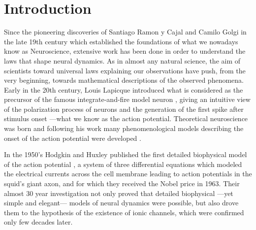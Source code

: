 \chapter*{\bf {Introduction}}
\label{cha:intro}




Since the pioneering discoveries of Santiago Ramon y Cajal and Camilo Golgi in
the late 19th century which established the foundations of what we nowadays know as
Neuroscience, extensive work has been done in order to understand the
laws that shape neural dynamics. As in almost any natural science,
the aim of scientists toward universal laws explaining our
observations have push, from the very beginning, towards mathematical
descriptions of the observed phenomena. Early in the 20th century,
Louis Lapicque introduced what is considered as the precursor  of
the famous integrate-and-fire model neuron \citep{Brunel2007}
\citep[see also][]{Brunel2007a,Abbott1999}, giving an intuitive view of the polarization
process of neurons and the generation of the  
first spike after stimulus onset ---what we know as
the action potential. Theoretical
neuroscience was born and following his work many phenomenological
models describing the onset of the action potential were developed
\citep{Hill1936,McCulloch1943,Stein1965,Geisler1966,Weiss1966,Stein1967b}.

In the 1950's Hodgkin and Huxley published the first detailed biophysical model
of the action potential \citep{Hodgkin1952}, a system of three differential equations
which modeled the electrical currents across the cell membrane leading to action potentials in
the squid's giant axon, and for which they received the Nobel price in
1963. Their almost 30 year investigation not only proved that 
detailed biophysical ---yet simple and elegant--- models of neural
dynamics were possible,  but
also drove them to the hypothesis of the existence of ionic channels,
which were confirmed only few decades later. 

